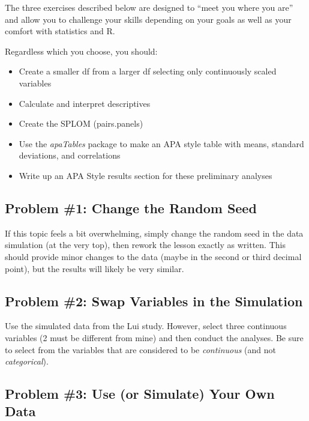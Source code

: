 \documentclass[
  11pt,
]{book}
\providecommand{\tightlist}{%
  \setlength{\itemsep}{0pt}\setlength{\parskip}{0pt}}
\begin{document}
The three exercises described below are designed to ``meet you where you are'' and allow you to challenge your skills depending on your goals as well as your comfort with statistics and R.

Regardless which you choose, you should:

\begin{itemize}
\tightlist
\item
  Create a smaller df from a larger df selecting only continuously scaled variables
\item
  Calculate and interpret descriptives
\item
  Create the SPLOM (pairs.panels)
\item
  Use the \emph{apaTables} package to make an APA style table with means, standard deviations, and correlations
\item
  Write up an APA Style results section for these preliminary analyses
\end{itemize}

\hypertarget{problem-1-change-the-random-seed}{%
\subsection{Problem \#1: Change the Random Seed}\label{problem-1-change-the-random-seed}}

If this topic feels a bit overwhelming, simply change the random seed in the data simulation (at the very top), then rework the lesson exactly as written. This should provide minor changes to the data (maybe in the second or third decimal point), but the results will likely be very similar.

\hypertarget{problem-2-swap-variables-in-the-simulation}{%
\subsection{Problem \#2: Swap Variables in the Simulation}\label{problem-2-swap-variables-in-the-simulation}}

Use the simulated data from the Lui \citeyearpar{lui_racial_2020} study. However, select three continuous variables (2 must be different from mine) and then conduct the analyses. Be sure to select from the variables that are considered to be \emph{continuous} (and not \emph{categorical}).

\hypertarget{problem-3-use-or-simulate-your-own-data}{%
\subsection{Problem \#3: Use (or Simulate) Your Own Data}\label{problem-3-use-or-simulate-your-own-data}}
\end{document}
